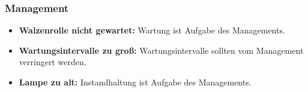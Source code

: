 \documentclass[12pt]{article}
\begin{document}
\subsubsection*{Management}
\begin{itemize}
	\item \textbf{Walzenrolle nicht gewartet:} Wartung ist Aufgabe des Managements.
	\item \textbf{Wartungsintervalle zu groß:} Wartungsintervalle sollten vom Management verringert werden.
	\item \textbf{Lampe zu alt:} Instandhaltung ist Aufgabe des Managements.
\end{itemize}
\end{document}
